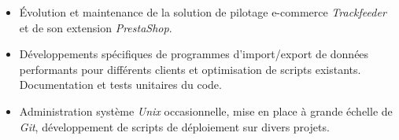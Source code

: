 \documentclass[a4paper]{article}
\begin{document}
\begin{itemize}
  \item Évolution et maintenance de la solution de pilotage e-commerce
  \textit{Trackfeeder} et de son extension \textit{PrestaShop}.
  \item Développements spécifiques de programmes d'import/export de
  données performants pour différents clients et optimisation de scripts
  existants. Documentation et tests unitaires du code.
  \item Administration système \textit{Unix} occasionnelle, mise en
  place à grande échelle de \textit{Git}, développement de scripts de
  déploiement sur divers projets.

\end{itemize}


\end{document}

